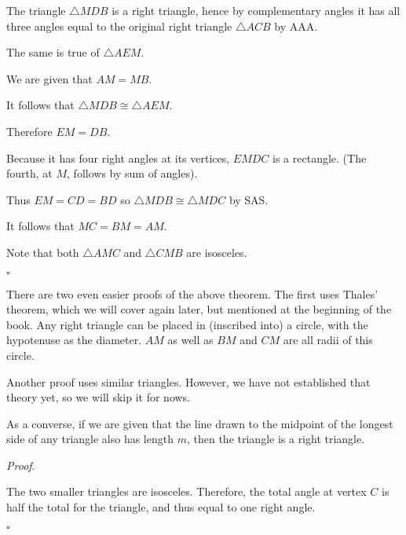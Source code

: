 \documentclass[11pt, oneside]{article}
\begin{document}
The triangle $\triangle MDB$ is a right triangle, hence by complementary angles it has all three angles equal to the original right triangle $\triangle ACB$ by AAA.

The same is true of $\triangle AEM$.

We are given that $AM = MB$.

It follows that $\triangle MDB \cong \triangle AEM$.

Therefore $EM = DB$.

Because it has four right angles at its vertices, $EMDC$ is a rectangle.  (The fourth, at $M$, follows by sum of angles).

Thus $EM = CD = BD$ so  $\triangle MDB \cong \triangle MDC$ by SAS.

It follows that $MC = BM = AM$.

Note that both $\triangle AMC$ and $\triangle CMB$ are isosceles.

$\square$

There are two even easier proofs of the above theorem.  The first uses Thales' theorem, which we will cover again later, but mentioned at the beginning of the book.  Any right triangle can be placed in (inscribed into) a circle, with the hypotenuse as the diameter.  $AM$ as well as $BM$ and $CM$ are all radii of this circle.

Another proof uses similar triangles.  However, we have not established that theory yet, so we will skip it for nows.

As a converse, if we are given that the line drawn to the midpoint of the longest side of any triangle also has length $m$, then the triangle is a right triangle.

\emph{Proof}.

The two smaller triangles are isosceles.  Therefore, the total angle at vertex $C$ is half the total for the triangle, and thus equal to one right angle.

$\square$
\end{document}
